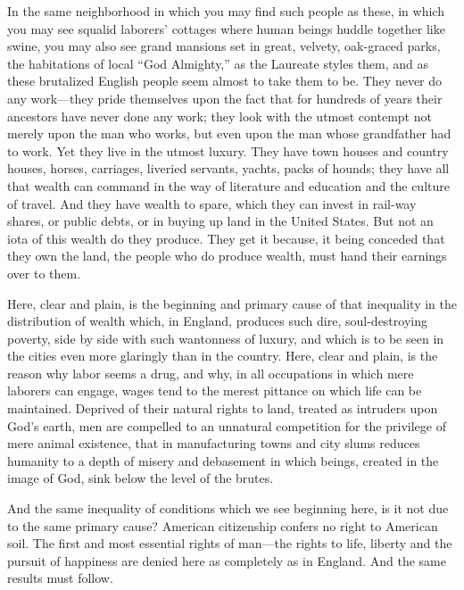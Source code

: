 \documentclass{book}
\begin{document}
In the same neighborhood in which you may find such people as these, in which you may see squalid laborers’ cottages where human beings huddle together like swine, you may also see grand mansions set in great, velvety, oak-graced parks, the habitations of local “God Almighty,” as the Laureate styles them, and as these brutalized English people seem almost to take them to be. They never do any work—they pride themselves upon the fact that for hundreds of years their ancestors have never done any work; they look with the utmost contempt not merely upon the man who works, but even upon the man whose grandfather had to work. Yet they live in the utmost luxury. They have town houses and country houses, horses, carriages, liveried servants, yachts, packs of hounds; they have all that wealth can command in the way of literature and education and the culture of travel. And they have wealth to spare, which they can invest in rail-way shares, or public debts, or in buying up land in the United States. But not an iota of this wealth do they produce. They get it because, it being conceded that they own the land, the people who do produce wealth, must hand their earnings over to them.

Here, clear and plain, is the beginning and primary cause of that inequality in the distribution of wealth which, in England, produces such dire, soul-destroying poverty, side by side with such wantonness of luxury, and which is to be seen in the cities even more glaringly than in the country. Here, clear and plain, is the reason why labor seems a drug, and why, in all occupations in which mere laborers can engage, wages tend to the merest pittance on which life can be maintained. Deprived of their natural rights to land, treated as intruders upon God’s earth, men are compelled to an unnatural competition for the privilege of mere animal existence, that in manufacturing towns and city slums reduces humanity to a depth of misery and debasement in which beings, created in the image of God, sink below the level of the brutes.

And the same inequality of conditions which we see beginning here, is it not due to the same primary cause? American citizenship confers no right to American soil. The first and most essential rights of man—the rights to life, liberty and the pursuit of happiness are denied here as completely as in England. And the same results must follow.
\end{document}
